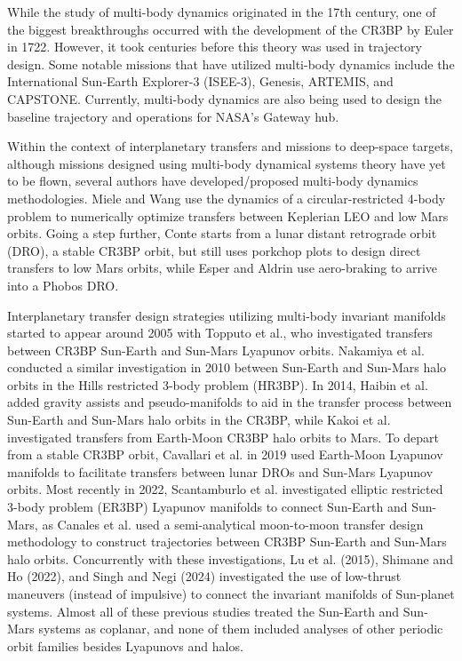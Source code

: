 While the study of multi-body dynamics originated in the 17th century, one of the biggest
breakthroughs occurred with the development of the CR3BP by Euler in 1722\cite{BarrowGreen:1997}.
However, it took centuries before this theory was used in trajectory design. Some notable missions
that have utilized multi-body dynamics include the International Sun-Earth Explorer-3
(ISEE-3)\cite{Farquhar:1984}, Genesis\cite{Lo:2001}, ARTEMIS\cite{Woodard:2009}, and
CAPSTONE\cite{Cheetham:2021}. Currently, multi-body dynamics are also being used to design the
baseline trajectory and operations for NASA's Gateway
hub\cite{Zamora:2024,Boudad:2022,ZimovanSpreen:2022}.

Within the context of interplanetary transfers and missions to deep-space targets, although
missions designed using multi-body dynamical systems theory have yet to be flown, several authors
have developed/proposed multi-body dynamics methodologies. Miele and Wang use the dynamics of a
circular-restricted 4-body problem to numerically optimize transfers between Keplerian LEO and low
Mars orbits\cite{Miele:1999}. Going a step further, Conte starts from a lunar distant retrograde
orbit (DRO), a stable CR3BP orbit, but still uses porkchop plots to design direct transfers to low
Mars orbits\cite{Conte:2017}, while Esper and Aldrin use aero-braking to arrive into a Phobos
DRO\cite{Esper:2019}.

Interplanetary transfer design strategies utilizing multi-body invariant manifolds started to
appear around 2005 with Topputo et al., who investigated transfers between CR3BP Sun-Earth and
Sun-Mars Lyapunov orbits\cite{Topputo:2005}. Nakamiya et al. conducted a similar investigation in
2010 between Sun-Earth and Sun-Mars halo orbits in the Hills restricted 3-body problem
(HR3BP)\cite{Nakamiya:2010}. In 2014, Haibin et al. added gravity assists and pseudo-manifolds to
aid in the transfer process between Sun-Earth and Sun-Mars halo orbits in the
CR3BP\cite{Haibin:2014}, while Kakoi et al. investigated transfers from Earth-Moon CR3BP halo
orbits to Mars\cite{Kakoi:2014}. To depart from a stable CR3BP orbit, Cavallari et al. in 2019 used
Earth-Moon Lyapunov manifolds to facilitate transfers between lunar DROs and Sun-Mars Lyapunov
orbits\cite{Cavallari:2019}. Most recently in 2022, Scantamburlo et al. investigated elliptic
restricted 3-body problem (ER3BP) Lyapunov manifolds to connect Sun-Earth and
Sun-Mars\cite{Scantamburlo:2022}, as Canales et al. used a semi-analytical moon-to-moon transfer
design methodology to construct trajectories between CR3BP Sun-Earth and Sun-Mars halo
orbits\cite{Canales:2021a,Canales:2022}. Concurrently with these investigations, Lu et al. (2015)\cite{Lu:2015},
Shimane and Ho (2022)\cite{Shimane:2022}, and Singh and Negi (2024)\cite{Singh:2024} investigated
the use of low-thrust maneuvers (instead of impulsive) to connect the invariant manifolds of
Sun-planet systems\cite{Lu:2015,Shimane:2022}. Almost all of these previous studies treated the
Sun-Earth and Sun-Mars systems as coplanar, and none of them included analyses of other periodic
orbit families besides Lyapunovs and halos.

